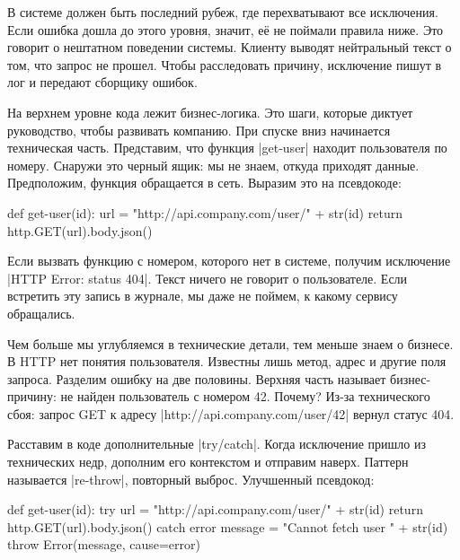 В системе должен быть последний рубеж, где перехватывают все исключения. Если
ошибка дошла до этого уровня, значит, е\"{е} не поймали правила ниже. Это
говорит о нештатном поведении системы. Клиенту выводят нейтральный текст о том,
что запрос не прошел. Чтобы расследовать причину, исключение пишут в лог и
передают сборщику ошибок.

На верхнем уровне кода лежит бизнес-логика. Это шаги, которые диктует
руководство, чтобы развивать компанию. При спуске вниз начинается техническая
часть. Представим, что функция \spverb|get-user| находит пользователя по
номеру. Снаружи это черный ящик: мы не знаем, откуда приходят
данные. Предположим, функция обращается в сеть. Выразим это на псевдокоде:


\begin{english}
  \begin{python}
def get-user(id):
  url = "http://api.company.com/user/" + str(id)
  return http.GET(url).body.json()
  \end{python}
\end{english}

Если вызвать функцию с номером, которого нет в системе, получим исключение
\spverb|HTTP Error: status 404|. Текст ничего не говорит о пользователе. Если
встретить эту запись в журнале, мы даже не поймем, к какому сервису обращались.

Чем больше мы углубляемся в технические детали, тем меньше знаем о бизнесе. В
HTTP нет понятия пользователя. Известны лишь метод, адрес и другие поля
запроса. Разделим ошибку на две половины. Верхняя часть называет бизнес-причину:
не найден пользователь с номером 42. Почему? Из-за технического сбоя: запрос GET
к адресу \spverb|http://api.company.com/user/42| вернул статус 404.

Расставим в коде дополнительные \spverb|try/catch|. Когда исключение пришло из
технических недр, дополним его контекстом и отправим наверх. Паттерн называется
\spverb|re-throw|, повторный выброс. Улучшенный псевдокод:

\begin{english}
  \begin{js}
def get-user(id):
  try {
    url = "http://api.company.com/user/" + str(id)
    return http.GET(url).body.json()
  } catch error {
    message = "Cannot fetch user " + str(id)
    throw Error(message, cause=error)
  }
  \end{js}
\end{english}

